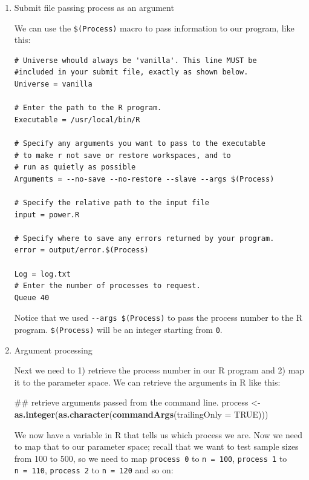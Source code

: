 \documentclass[]{book}
\newenvironment{Shaded}{\begin{snugshade}}{\end{snugshade}}
\newcommand{\KeywordTok}[1]{\textcolor[rgb]{0.13,0.29,0.53}{\textbf{#1}}}
\newcommand{\DataTypeTok}[1]{\textcolor[rgb]{0.13,0.29,0.53}{#1}}
\newcommand{\StringTok}[1]{\textcolor[rgb]{0.31,0.60,0.02}{#1}}
\newcommand{\OtherTok}[1]{\textcolor[rgb]{0.56,0.35,0.01}{#1}}
\newcommand{\NormalTok}[1]{#1}
\begin{document}
\begin{enumerate}
\def\labelenumi{\arabic{enumi}.}
\item
  Submit file passing process as an argument

  We can use the \texttt{\$(Process)} macro to pass information to our
  program, like this:

\begin{verbatim}
# Universe whould always be 'vanilla'. This line MUST be
#included in your submit file, exactly as shown below.
Universe = vanilla

# Enter the path to the R program.
Executable = /usr/local/bin/R

# Specify any arguments you want to pass to the executable
# to make r not save or restore workspaces, and to
# run as quietly as possible
Arguments = --no-save --no-restore --slave --args $(Process)

# Specify the relative path to the input file
input = power.R

# Specify where to save any errors returned by your program.
error = output/error.$(Process)

Log = log.txt
# Enter the number of processes to request.
Queue 40
\end{verbatim}

  Notice that we used \texttt{-\/-args\ \$(Process)} to pass the process
  number to the R program. \texttt{\$(Process)} will be an integer
  starting from \texttt{0}.
\item
  Argument processing

  Next we need to 1) retrieve the process number in our R program and 2)
  map it to the parameter space. We can retrieve the arguments in R like
  this:

\begin{Shaded}
\begin{Highlighting}[]
\NormalTok{## retrieve arguments passed from the command line.}
\NormalTok{process <-}\StringTok{ }\KeywordTok{as.integer}\NormalTok{(}\KeywordTok{as.character}\NormalTok{(}\KeywordTok{commandArgs}\NormalTok{(}\DataTypeTok{trailingOnly =} \OtherTok{TRUE}\NormalTok{)))}
\end{Highlighting}
\end{Shaded}

  We now have a variable in R that tells us which process we are. Now we
  need to map that to our parameter space; recall that we want to test
  sample sizes from 100 to 500, so we need to map \texttt{process\ 0} to
  \texttt{n\ =\ 100}, \texttt{process\ 1} to \texttt{n\ =\ 110},
  \texttt{process\ 2} to \texttt{n\ =\ 120} and so on:


\end{enumerate}
\end{document}
